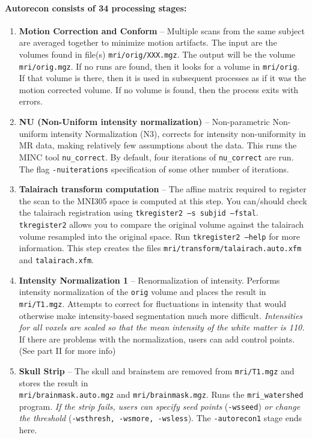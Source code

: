\documentclass[paper=a4, fontsize=11pt]{scrartcl} %
\numberwithin{equation}{section} %
\numberwithin{figure}{section} %
\numberwithin{table}{section} %
\begin{document}
\paragraph{Autorecon consists of 34 processing stages:}
\begin{enumerate}
    \item  \textbf{Motion Correction and Conform} -- Multiple scans from the same subject are averaged together to minimize motion artifacts.  The input are the volumes found in file(s) \texttt{mri/orig/XXX.mgz}. The output will be the volume \texttt{mri/orig.mgz}. If no runs are found, then it looks for a volume in \texttt{mri/orig}. If that volume is there, then it is used in subsequent processes as if it was the motion corrected volume. If no volume is found, then the process exits with errors.
    
    \item  \textbf{NU (Non-Uniform intensity normalization) }-- Non-parametric Non-uniform intensity Normalization (N3), corrects for intensity non-uniformity in MR data, making relatively few assumptions about the data. This runs the MINC tool \texttt{nu\_correct}. By default, four iterations of \texttt{nu\_correct} are run. The flag \texttt{-nuiterations} specification of some other number of iterations.
    
    \item  \textbf{Talairach transform computation} -- The affine matrix required to register the scan to the MNI305 space is computed at this step.  You can/should check the talairach registration using \texttt{tkregister2 --s subjid --fstal}. \texttt{tkregister2} allows you to compare the original volume against the talairach volume resampled into the original space. Run \texttt{tkregister2 --help} for more information. This step creates the files \texttt{mri/transform/talairach.auto.xfm} and \texttt{talairach.xfm}.
    
    \item  \textbf{Intensity Normalization 1}  -- Renormalization of intensity. Performs intensity normalization of the \texttt{orig} volume and places the result in \texttt{mri/T1.mgz}. Attempts to correct for fluctuations in intensity that would otherwise make intensity-based segmentation much more difficult. \textit{Intensities for all voxels are scaled so that the mean intensity of the white matter is 110.} If there are problems with the normalization, users can add control points. (See part II for more info) 
    
    \item  \textbf{Skull Strip} -- The skull and brainstem are removed from \texttt{mri/T1.mgz} and stores the result in \\ \texttt{mri/brainmask.auto.mgz} and \texttt{mri/brainmask.mgz}. Runs the \texttt{mri\_watershed} program. \textit{If the strip fails, users can specify seed points} (\texttt{-wsseed}) \textit{or change the threshold} (\texttt{-wsthresh, -wsmore, -wsless}). The \texttt{-autorecon1} stage ends here.
    

\end{enumerate}
\end{document}
